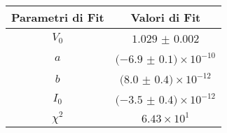 \begin{tabular}{cc}
\hline
	Parametri di Fit & Valori di Fit\\ 
\hline
	$V_0$ & $1.029$ $\pm$ $0.002$ \\
	$a$ & $(-6.9$ $\pm$ $0.1)\times 10^{-10}$ \\
	$b$ & $(8.0$ $\pm$ $0.4)\times 10^{-12}$ \\
	$I_0$ & $(-3.5$ $\pm$ $0.4)\times 10^{-12}$ \\
	$\chi^2$ & $6.43\times 10^{1}$ \\
\hline
\end{tabular}
